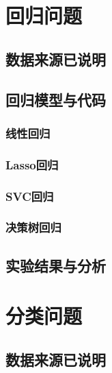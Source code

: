 \documentclass{ds201}
\begin{document}

\makecover

\tableofcontents

\newpage 


\section{回归问题}


\subsection{数据来源已说明}


\subsection{回归模型与代码}


\subsubsection{线性回归}

\subsubsection{Lasso回归}

\subsubsection{SVC回归}

\subsubsection{决策树回归}

\subsection{实验结果与分析}

\section{分类问题}

\subsection{数据来源已说明}
\end{document}
